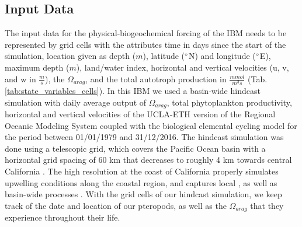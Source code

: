\subsection{Input Data}\label{sec:input_data}

The input data for the physical-biogeochemical forcing of the IBM needs to be represented by grid cells with the attributes time in days since the start of the simulation, location given as depth ($m$), latitude ($\degree$N) and  longitude ($\degree$E), maximum depth ($m$), land/water index, horizontal and vertical velocities (u, v, and w in $\frac{m}{s}$), the $\Omega_{arag}$, and the total autotroph production in $\frac{mmol}{m^3s}$ (Tab. \ref{tab:state_variables_cells}). In this IBM we used a basin-wide hindcast simulation with daily average output of $\Omega_{arag}$, total phytoplankton productivity, horizontal and vertical velocities of the UCLA-ETH version of the Regional Oceanic Modeling System \citep[ROMS; ][]{shchepetkin2005regional} coupled with the biological elemental cycling model \citep[BEC; ][]{moore2013marine} for the period between 01/01/1979 and 31/12/2016. The hindcast simulation was done using a telescopic grid, which covers the Pacific Ocean basin with a horizontal grid spacing of 60 km that decreases to roughly 4 km towards central California \citep{frischknecht2018origin}. The high resolution at the coast of California properly simulates upwelling conditions along the coastal region, and captures local \citep{frischknecht2018origin}, as well as basin-wide processes \citep{frischknecht2015remote,frischknecht2017local}. With the grid cells of our hindcast simulation, we keep track of the date and location of our pteropods, as well as the $\Omega_{arag}$ that they experience throughout their life.




